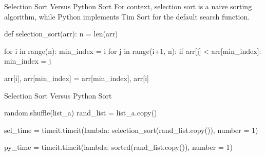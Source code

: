 \documentclass[
  ignorenonframetext,
]{beamer}
\newenvironment{Shaded}{\begin{snugshade}}{\end{snugshade}}
\newcommand{\BuiltInTok}[1]{\textcolor[rgb]{0.00,0.23,0.31}{#1}}
\newcommand{\ControlFlowTok}[1]{\textcolor[rgb]{0.00,0.23,0.31}{#1}}
\newcommand{\DecValTok}[1]{\textcolor[rgb]{0.68,0.00,0.00}{#1}}
\newcommand{\KeywordTok}[1]{\textcolor[rgb]{0.00,0.23,0.31}{#1}}
\newcommand{\NormalTok}[1]{\textcolor[rgb]{0.00,0.23,0.31}{#1}}
\newcommand{\OperatorTok}[1]{\textcolor[rgb]{0.37,0.37,0.37}{#1}}
\begin{document}
\begin{frame}[fragile]{Selection Sort Versus Python Sort}
\protect\hypertarget{selection-sort-versus-python-sort}{}
For context, selection sort is a naive sorting algorithm, while Python
implements Tim Sort for the default search function.

\begin{Shaded}
\begin{Highlighting}[]
\KeywordTok{def}\NormalTok{ selection\_sort(arr):}
\NormalTok{  n }\OperatorTok{=} \BuiltInTok{len}\NormalTok{(arr)}
  
  \ControlFlowTok{for}\NormalTok{ i }\KeywordTok{in} \BuiltInTok{range}\NormalTok{(n):}
\NormalTok{    min\_index }\OperatorTok{=}\NormalTok{ i}
    \ControlFlowTok{for}\NormalTok{ j }\KeywordTok{in} \BuiltInTok{range}\NormalTok{(i}\OperatorTok{+}\DecValTok{1}\NormalTok{, n):}
      \ControlFlowTok{if}\NormalTok{ arr[j] }\OperatorTok{\textless{}}\NormalTok{ arr[min\_index]:}
\NormalTok{        min\_index }\OperatorTok{=}\NormalTok{ j}
        
\NormalTok{    arr[i], arr[min\_index] }\OperatorTok{=}\NormalTok{ arr[min\_index], arr[i]}
\end{Highlighting}
\end{Shaded}
\end{frame}

\begin{frame}[fragile]{Selection Sort Versus Python Sort}
\protect\hypertarget{selection-sort-versus-python-sort-1}{}
\begin{Shaded}
\begin{Highlighting}[]
\NormalTok{random.shuffle(list\_a)}
\NormalTok{rand\_list }\OperatorTok{=}\NormalTok{ list\_a.copy()}

\NormalTok{sel\_time }\OperatorTok{=}\NormalTok{ timeit.timeit(}\KeywordTok{lambda}\NormalTok{:}
\NormalTok{  selection\_sort(rand\_list.copy()), number }\OperatorTok{=} \DecValTok{1}\NormalTok{)}
  
\NormalTok{py\_time }\OperatorTok{=}\NormalTok{ timeit.timeit(}\KeywordTok{lambda}\NormalTok{:}
  \BuiltInTok{sorted}\NormalTok{(rand\_list.copy()), number }\OperatorTok{=} \DecValTok{1}\NormalTok{)}
\end{Highlighting}
\end{Shaded}
\end{frame}
\end{document}
